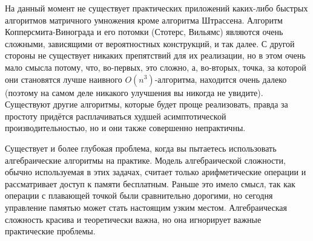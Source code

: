 На данный момент не существует практических приложений каких-либо быстрых алгоритмов матричного умножения кроме алгоритма Штрассена. Алгоритм Коппер\-смита-Винограда и его потомки (Стотерс, Вильямс) являются очень сложными, зависящими от вероятностных конструкций, и так далее. С другой стороны не существует никаких препятствий для их реализации, но в этом очень мало смысла потому, что, во-первых, это сложно, а, во-вторых, точка, за которой они становятся лучше наивного $O(n^3)$-алгоритма, находится очень далеко (поэтому на самом деле никакого улучшения вы никогда не увидите). Существуют другие алгоритмы, которые будет проще реализовать, правда за простоту придётся расплачиваться худшей асимптотической производительностью, но и они также совершенно непрактичны.

Существует и более глубокая проблема, когда вы пытаетесь использовать алгебраические алгоритмы на практике. Модель алгебраической сложности, обычно используемая в этих задачах, считает только арифметические операции и рассматривает доступ к памяти бесплатным. Раньше это имело смысл, так как операции с плавающей точкой были сравнительно дорогими, но сегодня управление памятью может стать настоящим узким местом. Алгебраическая сложность красива и теоретически важна, но она игнорирует важные практические проблемы.

